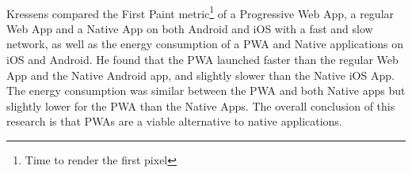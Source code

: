 \documentclass{kththesis}
\begin{document}
\paragraph{}
Kressens \cite{PWAapplicability} compared the First Paint metric\footnote{Time to render the first pixel}  of a Progressive Web App, a regular Web App and a Native App on both Android and iOS with a fast and slow network, as well as the energy consumption of a PWA and Native applications on iOS and Android. He found that the PWA launched faster than the regular Web App and the Native Android app, and slightly slower than the Native iOS App. The energy consumption was similar between the PWA and both Native apps but slightly lower for the PWA than the Native Apps. The overall conclusion of this research is that PWAs are a viable alternative to native applications.
\end{document}
